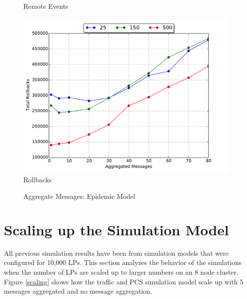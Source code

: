 \documentclass[11pt]{book}
\begin{document}
\begin{figure}
\begin{minipage}{.5\textwidth}
\begin{center}
      Remote Events \\
    \end{center}
  \end{minipage}%
  \hfill
  \begin{minipage}{.5\textwidth}
    \begin{center}
      \includegraphics[width=\textwidth,keepaspectratio,quiet]{figs/partitioning_communication/aggregate_epidemic_rollbacks.pdf} \\
      Rollbacks \\
    \end{center}
  \end{minipage}
  \caption{Aggregate Messages: Epidemic Model}\label{aggregate_epidemic}
\end{figure}

\section{Scaling up the Simulation Model}

All previous simulation results have been from simulation models that were configured for
10,000 LPs.  This section analyzes the behavior of the simulations when the number of LPs are
scaled up to larger numbers on an 8 node cluster.  Figure \ref{scaling} shows how the traffic
and PCS simulation model scale up with 5 messages aggregated and no message aggregation.
\end{document}
